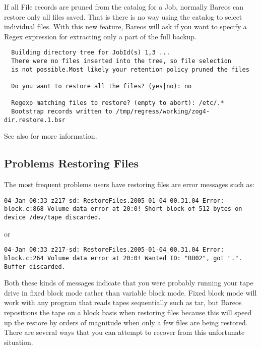   If all File records are pruned from the catalog
  for a Job, normally Bareos can restore only all files saved. That
  is there is no way using the catalog to select individual files.
  With this new feature, Bareos will ask if you want to specify a Regex
  expression for extracting only a part of the full backup.

\begin{verbatim}
  Building directory tree for JobId(s) 1,3 ...
  There were no files inserted into the tree, so file selection
  is not possible.Most likely your retention policy pruned the files

  Do you want to restore all the files? (yes|no): no

  Regexp matching files to restore? (empty to abort): /etc/.*
  Bootstrap records written to /tmp/regress/working/zog4-dir.restore.1.bsr
\end{verbatim}

  See also  for more information.


\subsection{Problems Restoring Files}


The most frequent problems users have restoring files are error messages such
as:

\footnotesize
\begin{verbatim}
04-Jan 00:33 z217-sd: RestoreFiles.2005-01-04_00.31.04 Error:
block.c:868 Volume data error at 20:0! Short block of 512 bytes on
device /dev/tape discarded.
\end{verbatim}
\normalsize

or

\footnotesize
\begin{verbatim}
04-Jan 00:33 z217-sd: RestoreFiles.2005-01-04_00.31.04 Error:
block.c:264 Volume data error at 20:0! Wanted ID: "BB02", got ".".
Buffer discarded.
\end{verbatim}
\normalsize

Both these kinds of messages indicate that you were probably running your tape
drive in fixed block mode rather than variable block mode. Fixed block mode
will work with any program that reads tapes sequentially such as tar, but
Bareos repositions the tape on a block basis when restoring files because this
will speed up the restore by orders of magnitude when only a few files are being
restored. There are several ways that you can attempt to recover from this
unfortunate situation.

